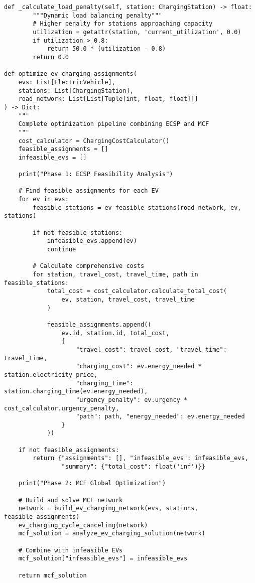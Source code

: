 \documentclass[12pt,a4paper]{article}
\begin{document}
\begin{lstlisting}[caption=Multi-Component Cost Calculator,label=lst:cost]
    def _calculate_load_penalty(self, station: ChargingStation) -> float:
        """Dynamic load balancing penalty"""
        # Higher penalty for stations approaching capacity
        utilization = getattr(station, 'current_utilization', 0.0)
        if utilization > 0.8:
            return 50.0 * (utilization - 0.8)
        return 0.0

def optimize_ev_charging_assignments(
    evs: List[ElectricVehicle],
    stations: List[ChargingStation],
    road_network: List[List[Tuple[int, float, float]]]
) -> Dict:
    """
    Complete optimization pipeline combining ECSP and MCF
    """
    cost_calculator = ChargingCostCalculator()
    feasible_assignments = []
    infeasible_evs = []
    
    print("Phase 1: ECSP Feasibility Analysis")
    
    # Find feasible assignments for each EV
    for ev in evs:
        feasible_stations = ev_feasible_stations(road_network, ev, stations)
        
        if not feasible_stations:
            infeasible_evs.append(ev)
            continue
            
        # Calculate comprehensive costs
        for station, travel_cost, travel_time, path in feasible_stations:
            total_cost = cost_calculator.calculate_total_cost(
                ev, station, travel_cost, travel_time
            )
            
            feasible_assignments.append((
                ev.id, station.id, total_cost,
                {
                    "travel_cost": travel_cost, "travel_time": travel_time,
                    "charging_cost": ev.energy_needed * station.electricity_price,
                    "charging_time": station.charging_time(ev.energy_needed),
                    "urgency_penalty": ev.urgency * cost_calculator.urgency_penalty,
                    "path": path, "energy_needed": ev.energy_needed
                }
            ))
    
    if not feasible_assignments:
        return {"assignments": [], "infeasible_evs": infeasible_evs, 
                "summary": {"total_cost": float('inf')}}
    
    print("Phase 2: MCF Global Optimization")
    
    # Build and solve MCF network
    network = build_ev_charging_network(evs, stations, feasible_assignments)
    ev_charging_cycle_canceling(network)
    mcf_solution = analyze_ev_charging_solution(network)
    
    # Combine with infeasible EVs
    mcf_solution["infeasible_evs"] = infeasible_evs
    
    return mcf_solution
\end{lstlisting}
\end{document}
